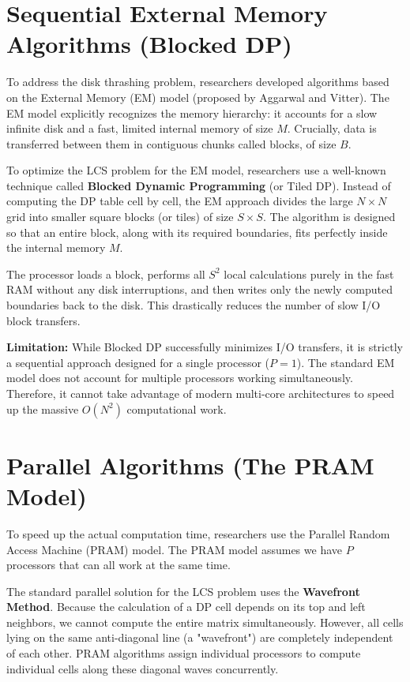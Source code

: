 \section{Sequential External Memory Algorithms (Blocked DP)}
To address the disk thrashing problem, researchers developed algorithms based on the External Memory (EM) model (proposed by Aggarwal and Vitter)\cite{av-ioc-88}. The EM model explicitly recognizes the memory hierarchy: it accounts for a slow infinite disk and a fast, limited internal memory of size $M$. Crucially, data is transferred between them in contiguous chunks called blocks, of size $B$.

To optimize the LCS problem for the EM model, researchers use a well-known technique called \textbf{Blocked Dynamic Programming} (or Tiled DP). 
Instead of computing the DP table cell by cell, the EM approach divides the large $N \times N$ grid into smaller square blocks (or tiles) of size $S \times S$. The algorithm is designed so that an entire block, along with its required boundaries, fits perfectly inside the internal memory $M$. 

The processor loads a block, performs all $S^2$ local calculations purely in the fast RAM without any disk interruptions, and then writes only the newly computed boundaries back to the disk. This drastically reduces the number of slow I/O block transfers.

\textbf{Limitation:} While Blocked DP successfully minimizes I/O transfers, it is strictly a sequential approach designed for a single processor ($P=1$). The standard EM model does not account for multiple processors working simultaneously. Therefore, it cannot take advantage of modern multi-core architectures to speed up the massive $O(N^2)$ computational work.

\section{Parallel Algorithms (The PRAM Model)}
To speed up the actual computation time, researchers use the Parallel Random Access Machine (PRAM) model\cite{jaja-ipa-92}. The PRAM model assumes we have $P$ processors that can all work at the same time. 

The standard parallel solution for the LCS problem uses the \textbf{Wavefront Method}. Because the calculation of a DP cell depends on its top and left neighbors, we cannot compute the entire matrix simultaneously. However, all cells lying on the same anti-diagonal line (a "wavefront") are completely independent of each other. PRAM algorithms assign individual processors to compute individual cells along these diagonal waves concurrently. 

